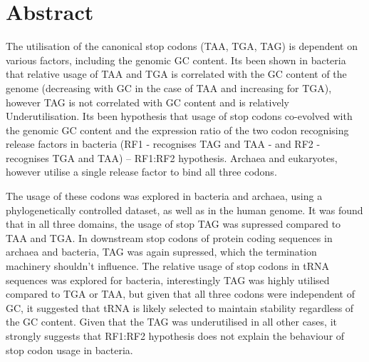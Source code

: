 \documentclass[../main.tex]{subfile}
\begin{document}
\pagebreak\section*{Abstract}
    The utilisation of the canonical stop codons (TAA, TGA, TAG) is dependent on various factors, including the genomic GC content. Its been shown in bacteria that relative usage of TAA and TGA is correlated with the GC content of the genome (decreasing with GC in the case of TAA and increasing for TGA), however TAG is not correlated with GC content and is relatively Underutilisation. Its been hypothesis that usage of stop codons co-evolved with the genomic GC content and the expression ratio of the two codon recognising release factors in bacteria (RF1 - recognises TAG and TAA - and RF2 - recognises TGA and TAA) -- RF1:RF2 hypothesis. Archaea and eukaryotes, however utilise a single release factor to bind all three codons.

    The usage of these codons was explored in bacteria and archaea, using a phylogenetically controlled dataset, as well as in the human genome. It was found that in all three domains, the usage of stop TAG was supressed compared to TAA and TGA. In downstream stop codons of protein coding sequences in archaea and bacteria, TAG was again supressed, which the termination machinery shouldn't influence. The relative usage of stop codons in tRNA sequences was explored for bacteria, interestingly TAG was highly utilised compared to TGA or TAA, but given that all three codons were independent of GC, it suggested that tRNA is likely selected to maintain stability regardless of the GC content.
    Given that the TAG was underutilised in all other cases, it strongly suggests that RF1:RF2 hypothesis does not explain the behaviour of stop codon usage in bacteria.
\end{document}
